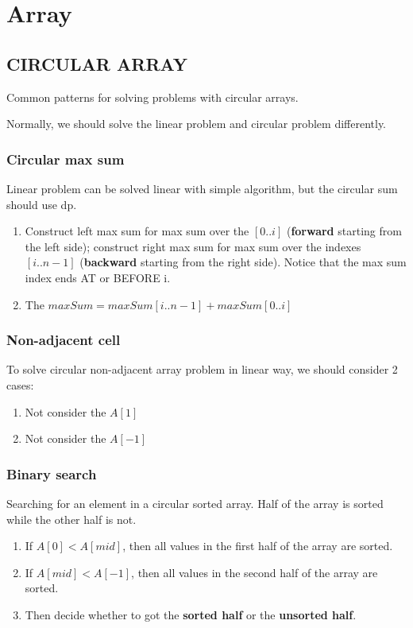 \chapter{Array}
\section{CIRCULAR ARRAY}
Common patterns for solving problems with circular arrays.

Normally, we should solve the linear problem and circular problem differently.

\subsection{Circular max sum}
Linear problem can be solved linear with simple algorithm, but the circular sum should use dp. 
\begin{enumerate}
\item Construct left max sum for max sum over the $[0..i]$ (\textbf{forward} starting from the left side); construct right max sum for max sum over the indexes $[i..n-1]$ (\textbf{backward} starting from the right side). Notice that the max sum index ends AT or BEFORE i. 
\item The $maxSum = maxSum[i..n-1]+maxSum[0..i]$
\end{enumerate}

\subsection{Non-adjacent cell}
To solve circular non-adjacent array problem in linear way, we should consider 2 cases:
\begin{enumerate}
\item Not consider the $A[1]$
\item Not consider the $A[-1]$ 
\end{enumerate}

\subsection{Binary search}
Searching for an element in a circular sorted array. Half of the array is sorted while the other half is not.
\begin{enumerate}
\item If $A[0] < A[mid]$, then all values in the first half of the array are sorted.
\item If $A[mid] < A[-1]$, then all values in the second half of the array are sorted.
\item Then decide whether to got the \textbf{sorted half} or the \textbf{unsorted half}.
\end{enumerate}

